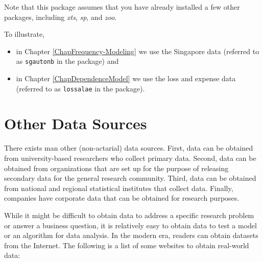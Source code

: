 \documentclass[
  12pt,
  krantz2]{Format/krantzNoCorner}
\providecommand{\tightlist}{%
  \setlength{\itemsep}{0pt}\setlength{\parskip}{0pt}}
\begin{document}
Note that this package assumes that you have already installed a few other packages, including \emph{xts}, \emph{sp}, and \emph{zoo}.

To illustrate,

\begin{itemize}
\tightlist
\item
  in Chapter \ref{ChapFrequency-Modeling} we use the Singapore data (referred to as \texttt{sgautonb} in the package) and
\item
  in Chapter \ref{ChapDependenceModel} we use the loss and expense data (referred to as \texttt{lossalae} in the package).
\end{itemize}

\hypertarget{other-data-sources}{%
\section{Other Data Sources}\label{other-data-sources}}

There exists man other (non-actarial) data sources. First, data can be obtained from university-based researchers who collect primary data. Second, data can be obtained from organizations that are set up for the purpose of releasing secondary data for the general research community. Third, data can be obtained from national and regional statistical institutes that collect data. Finally, companies have corporate data that can be obtained for research purposes.

While it might be difficult to obtain data to address a specific research problem or answer a business question, it is relatively easy to obtain data to test a model or an algorithm for data analysis. In the modern era, readers can obtain datasets from the Internet. The following is a list of some websites to obtain real-world data:
\end{document}

